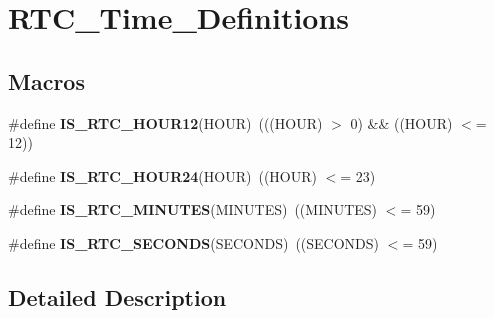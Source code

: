 \hypertarget{group___r_t_c___time___definitions}{}\section{R\+T\+C\+\_\+\+Time\+\_\+\+Definitions}
\label{group___r_t_c___time___definitions}
\subsection*{Macros}
\begin{DoxyCompactItemize}
\item 
\hypertarget{group___r_t_c___time___definitions_ga6bdfe3bed0a57dfafc2d1de785d48a62}{}\#define {\bfseries I\+S\+\_\+\+R\+T\+C\+\_\+\+H\+O\+U\+R12}(H\+O\+U\+R)~(((H\+O\+U\+R) $>$ 0) \&\& ((H\+O\+U\+R) $<$= 12))\label{group___r_t_c___time___definitions_ga6bdfe3bed0a57dfafc2d1de785d48a62}

\item 
\hypertarget{group___r_t_c___time___definitions_ga4883613bec76074ac62608b89e3f48a8}{}\#define {\bfseries I\+S\+\_\+\+R\+T\+C\+\_\+\+H\+O\+U\+R24}(H\+O\+U\+R)~((H\+O\+U\+R) $<$= 23)\label{group___r_t_c___time___definitions_ga4883613bec76074ac62608b89e3f48a8}

\item 
\hypertarget{group___r_t_c___time___definitions_ga8475ceaf2d35d98be0b3401812aef445}{}\#define {\bfseries I\+S\+\_\+\+R\+T\+C\+\_\+\+M\+I\+N\+U\+T\+E\+S}(M\+I\+N\+U\+T\+E\+S)~((M\+I\+N\+U\+T\+E\+S) $<$= 59)\label{group___r_t_c___time___definitions_ga8475ceaf2d35d98be0b3401812aef445}

\item 
\hypertarget{group___r_t_c___time___definitions_gadb5a39d98fc906a8ea035bd29308bc5c}{}\#define {\bfseries I\+S\+\_\+\+R\+T\+C\+\_\+\+S\+E\+C\+O\+N\+D\+S}(S\+E\+C\+O\+N\+D\+S)~((S\+E\+C\+O\+N\+D\+S) $<$= 59)\label{group___r_t_c___time___definitions_gadb5a39d98fc906a8ea035bd29308bc5c}

\end{DoxyCompactItemize}


\subsection{Detailed Description}

